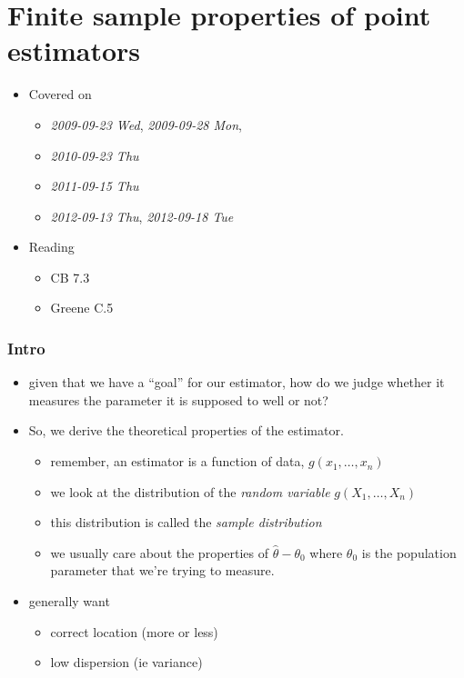 
\part*{Finite sample properties of point estimators}%

\begin{itemize}
\item Covered on
\begin{itemize}
\item \textit{2009-09-23 Wed}, \textit{2009-09-28 Mon},
\item \textit{2010-09-23 Thu}
\item \textit{2011-09-15 Thu}
\item \textit{2012-09-13 Thu}, \textit{2012-09-18 Tue}
\end{itemize}
\item Reading
\begin{itemize}
\item CB 7.3
\item Greene C.5
\end{itemize}
\end{itemize}
\section{Intro}
\label{sec-1}

\begin{itemize}
\item given that we have a ``goal'' for our estimator, how do we judge
     whether it measures the parameter it is supposed to well or not?
\item So, we derive the theoretical properties of the estimator.
\begin{itemize}
\item remember, an estimator is a function of data, $g(x_1,\dots,x_n)$
\item we look at the distribution of the \emph{random variable} $g(X_1,\dots,X_n)$
\item this distribution is called the \emph{sample distribution}
\item we usually care about the properties of $\hat \theta -
       \theta_0$ where $\theta_0$ is the population parameter that
       we're trying to measure.
\end{itemize}
\item generally want
\begin{itemize}
\item correct location (more or less)
\item low dispersion (ie variance)
\end{itemize}
\end{itemize}
